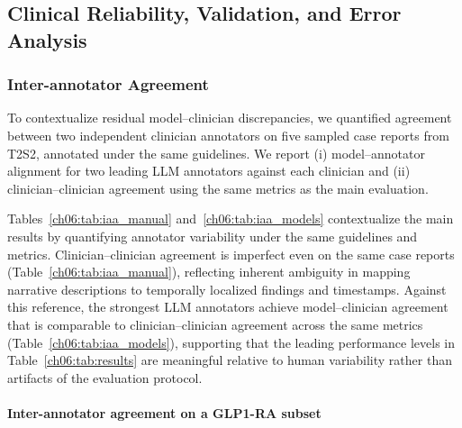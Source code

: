 \subsection{Clinical Reliability, Validation, and Error Analysis}
\label{ch06:sec:additional_validation}

\ChSixHeadingOnly

\subsubsection{Inter-annotator Agreement}
\label{ch06:sec:iaa}
To contextualize residual model--clinician discrepancies, we quantified agreement between two independent clinician annotators on five sampled case reports from T2S2, annotated under the same guidelines.
We report (i) model--annotator alignment for two leading LLM annotators against each clinician and (ii) clinician--clinician agreement using the same metrics as the main evaluation.









Tables~\ref{ch06:tab:iaa_manual} and~\ref{ch06:tab:iaa_models} contextualize the main results by quantifying annotator variability under the same guidelines and metrics.
Clinician--clinician agreement is imperfect even on the same case reports (Table~\ref{ch06:tab:iaa_manual}), reflecting inherent ambiguity in mapping narrative descriptions to temporally localized findings and timestamps.
Against this reference, the strongest LLM annotators achieve model--clinician agreement that is comparable to clinician--clinician agreement across the same metrics (Table~\ref{ch06:tab:iaa_models}), supporting that the leading performance levels in Table~\ref{ch06:tab:results} are meaningful relative to human variability rather than artifacts of the evaluation protocol.

\paragraph{Inter-annotator agreement on a GLP1-RA subset}
\label{ch05:glp_iaa}


